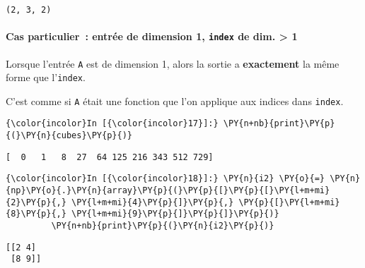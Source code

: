     \begin{Verbatim}[commandchars=\\\{\},frame=single,framerule=0.3mm,rulecolor=\color{cellframecolor}]
(2, 3, 2)
\end{Verbatim}

    \hypertarget{cas-particulier-entruxe9e-de-dimension-1-index-de-dim.-1}{%
\paragraph{\texorpdfstring{Cas particulier~: entrée de dimension 1,
\texttt{index} de dim. \textgreater{}
1}{Cas particulier~: entrée de dimension 1, index de dim. \textgreater{} 1}}\label{cas-particulier-entruxe9e-de-dimension-1-index-de-dim.-1}}

Lorsque l'entrée \texttt{A} est de dimension 1, alors la sortie a
\textbf{exactement} la même forme que l'\texttt{index}.

C'est comme si \texttt{A} était une fonction que l'on applique aux
indices dans \texttt{index}.

    \begin{Verbatim}[commandchars=\\\{\},frame=single,framerule=0.3mm,rulecolor=\color{cellframecolor}]
{\color{incolor}In [{\color{incolor}17}]:} \PY{n+nb}{print}\PY{p}{(}\PY{n}{cubes}\PY{p}{)}
\end{Verbatim}


    \begin{Verbatim}[commandchars=\\\{\},frame=single,framerule=0.3mm,rulecolor=\color{cellframecolor}]
[  0   1   8  27  64 125 216 343 512 729]
\end{Verbatim}

    \begin{Verbatim}[commandchars=\\\{\},frame=single,framerule=0.3mm,rulecolor=\color{cellframecolor}]
{\color{incolor}In [{\color{incolor}18}]:} \PY{n}{i2} \PY{o}{=} \PY{n}{np}\PY{o}{.}\PY{n}{array}\PY{p}{(}\PY{p}{[}\PY{p}{[}\PY{l+m+mi}{2}\PY{p}{,} \PY{l+m+mi}{4}\PY{p}{]}\PY{p}{,} \PY{p}{[}\PY{l+m+mi}{8}\PY{p}{,} \PY{l+m+mi}{9}\PY{p}{]}\PY{p}{]}\PY{p}{)}
         \PY{n+nb}{print}\PY{p}{(}\PY{n}{i2}\PY{p}{)}
\end{Verbatim}


    \begin{Verbatim}[commandchars=\\\{\},frame=single,framerule=0.3mm,rulecolor=\color{cellframecolor}]
[[2 4]
 [8 9]]
\end{Verbatim}

